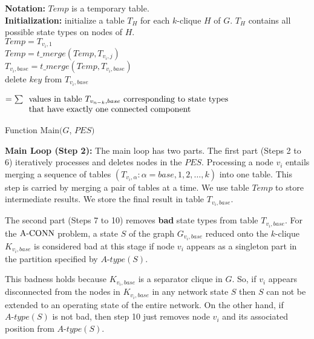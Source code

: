 \begin{algorithm} [!htb]
\Indm
{}
\textbf {Notation:} $Temp$ is a temporary table.\\
\nwline
\Indp
\nl \textbf{Initialization:} initialize a table $T_H$ for each $k$-clique $H$ of $G$.  
 $T_H$ contains all possible state types on nodes of $H$.\\
\nl{}
{
\nl $ Temp=T_{v_i,1}$  \\
 \nl {}
 {
  \nl $Temp=t\_merge(Temp,T_{v_i,j})$\\
 }
 \nl$T_{v_i,base}=t\_merge(Temp,T_{v_i,base})$\\
 \nl {}
 {
 \nl {}
 {
 \nl delete $key$ from $T_{v_i,base}$
 }
 }
}

\nl {} $=\sum \begin{array}[t]{l}
 \mbox{values in table }T_{v_{n-k},base} \mbox{ corresponding to state types}\\ \mbox{that have exactly one connected component}
\end{array}$

\caption{Function Main$(G$, $PES)$}
\label{Alg:fmain1}
\end{algorithm}
\textbf{Main Loop (Step 2):} The main loop has two parts. The first part (Steps 2 to 6) iteratively processes and deletes nodes in the $PES$. Processing a node $v_i$ entails merging a sequence of tables $(T_{v_i,\alpha}: \alpha=base, 1, 2, \ldots,k)$ into one table. This step is carried by merging a pair of tables at a time. We use table $Temp$ to store intermediate results. We store the final result in table $T_{v_i,base}$. 

The second part (Steps 7 to 10) removes \textbf{bad} state types from table $T_{v_i,base}$. For the ${\mathrm {A\mbox{-}CONN}}$ problem, a state $S$ of the graph $G_{v_i,base}$ reduced onto the $k$-clique $K_{v_i,base}$ is considered bad at this stage if node $v_i$ appears as a singleton part in the partition specified by $A\mbox{-}type(S)$.
 
This badness holds because $K_{v_i,base}$ is a separator clique in $G$. So, if $v_i$ appears disconnected from the nodes in $K_{v_i,base}$ in any network state $S$ then $S$ can not be extended to an operating state of the entire network. On the other hand, if $A\mbox{-}type(S)$ is not bad, then step 10 just removes node $v_i$ and its associated position from $A\mbox{-}type(S)$.

